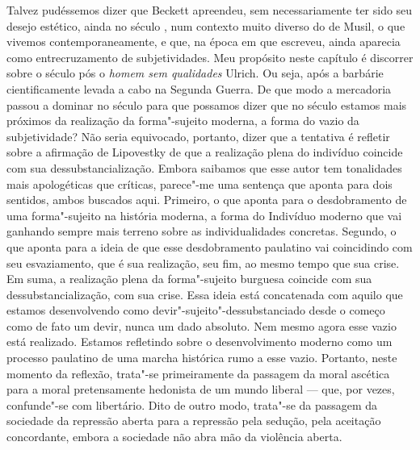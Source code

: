 Talvez pudéssemos dizer que Beckett apreendeu, sem necessariamente ter
sido seu desejo estético, ainda no século , num contexto muito diverso
do de Musil, o que vivemos contemporaneamente, e que, na época em que
escreveu, ainda aparecia como entrecruzamento de subjetividades. Meu
propósito neste capítulo é discorrer sobre o século  pós o \emph{homem
sem qualidades} Ulrich. Ou seja, após a barbárie cientificamente levada a
cabo na Segunda Guerra. De que modo a mercadoria passou a dominar no
século  para que possamos dizer que no século  estamos mais
próximos da realização da forma"-sujeito moderna, a forma do vazio da
subjetividade? Não seria equivocado, portanto, dizer que a tentativa é refletir sobre a
afirmação de Lipovestky de que a realização plena do indivíduo coincide
com sua dessubstancialização. Embora saibamos que esse autor tem
tonalidades mais apologéticas que críticas, parece"-me uma sentença que
aponta para dois sentidos, ambos buscados aqui. Primeiro, o que aponta para o
desdobramento de uma forma"-sujeito na história moderna, a forma do
Indivíduo moderno que vai ganhando sempre mais terreno sobre as
individualidades concretas. Segundo, o que aponta para a ideia de que esse desdobramento
paulatino vai coincidindo com seu esvaziamento, que é sua realização, seu fim, ao
mesmo tempo que sua crise. Em suma, a realização plena da forma"-sujeito
burguesa coincide com sua dessubstancialização, com sua crise. Essa
ideia está concatenada com aquilo que estamos desenvolvendo como
devir"-sujeito"-dessubstanciado desde o começo como de fato um devir,
nunca um dado absoluto. Nem mesmo agora esse vazio está realizado.
Estamos refletindo sobre o desenvolvimento moderno como um processo
paulatino de uma marcha histórica rumo a esse vazio. Portanto, neste momento
da reflexão, trata"-se primeiramente da passagem da moral ascética
para a moral pretensamente hedonista de um mundo liberal --- que, por
vezes, confunde"-se com libertário. Dito de outro modo, trata"-se da
passagem da sociedade da repressão aberta para a repressão pela sedução,
pela aceitação concordante, embora a sociedade não abra mão da violência
aberta.

